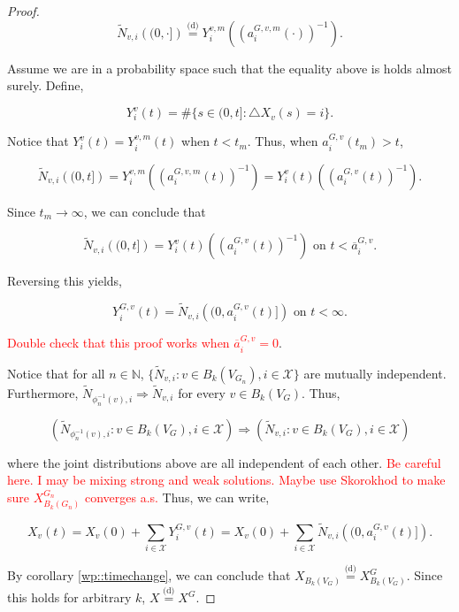 \documentclass[12pt]{article}
\newcommand{\mb}{\mathbb}
\newcommand{\mc}{\mathcal}
\newcommand{\ra}{\rightarrow}
\newcommand{\ov}{\overline}
\newcommand{\te}{\text}
\newcommand{\tr}{\textcolor{red}}
\newcommand{\ind}{\hspace{24pt}}
\newcommand{\deq}{\overset{\text{(d)}}{=}}			%
\newcommand{\sta}{\mc{X}}							%
\newcommand{\Xf}{X}									%
\newcommand{\poiss}{N}								%
\newcommand{\poissv}[1]{_{#1}}						%
\newcommand{\vind}[1]{_{#1}}						%
\newcommand{\tme}[1]{(#1)}							%
\newcommand{\gind}[1]{^{#1}}						%
\newcommand{\vpara}[1]{^{#1}}						%
\newcommand{\stpara}[1]{_{#1}}						%
\newcommand{\gvpara}[2]{^{#1,#2}}					%
\newcommand{\compen}{a}								%
\newcommand{\compenbd}{\ov{a}}						%
\newcommand{\binver}[1]{(#1)^{-1}}					%
\newcommand{\Xg}{Y}									%
\newcommand{\alt}[1]{\tilde{#1}}					%
\newcommand{\gvjpara}[3]{^{#1,#2,#3}}				%
\begin{document}
\begin{proof}
\[\alt{\poiss}\poissv{v,i}\left((0,\cdot]\right) \deq \Xg^{v,m}\stpara{i}\left(\binver{\compen\gvjpara{G}{v}{m}\stpara{i}\left(\cdot\right)}\right).\]

Assume we are in a probability space such that the equality above is holds almost surely. Define,

\[\Xg\vpara{v}\stpara{i}\tme{t} = \#\{s \in (0,t]: \triangle\Xf\vind{v}\tme{s} = i\}.\]

Notice that \(\Xg\vpara{v}\stpara{i}\tme{t} = \Xg^{v,m}\stpara{i}\tme{t}\) when \(t < t_m\). Thus, when \(\compen\gvpara{G}{v}\stpara{i}(t_m) > t\),

\[\alt{\poiss}\poissv{v,i}\left((0,t]\right) = \Xg^{v,m}\stpara{i}\left(\binver{\compen\gvjpara{G}{v}{m}\stpara{i}\tme{t}}\right) = \Xg\vpara{v}\stpara{i}\tme{t}\left(\binver{\compen\gvpara{G}{v}\stpara{i}\tme{t}}\right).\]

Since \(t_m \ra\infty\), we can conclude that 

\[\alt{\poiss}\poissv{v,i}\left((0,t]\right) = \Xg\vpara{v}\stpara{i}\tme{t}\left(\binver{\compen\gvpara{G}{v}\stpara{i}\tme{t}}\right) \te{ on } t < \compenbd\gvpara{G}{v}\stpara{i}.\]

Reversing this yields,

\[\Xg\gvpara{G}{v}\stpara{i}\tme{t} = \alt{\poiss}\poissv{v,i}\left((0,\compen\gvpara{G}{v}\stpara{i}\tme{t}]\right) \te{ on } t < \infty.\]

\tr{Double check that this proof works when \(\compenbd\gvpara{G}{v}\stpara{i} = 0\)}.

\ind Notice that for all \(n \in \mb{N}\), \(\{\alt{\poiss}\vind{v,i}:v \in B_k(V_{G_n}),i\in \sta\}\) are mutually independent. Furthermore, \(\alt{\poiss}\vind{\phi_n^{-1}(v),i} \Rightarrow  \alt{\poiss}\vind{v,i}\) for every \(v \in B_k(V_G)\). Thus,

\[\left(\alt{\poiss}\vind{\phi_n^{-1}(v),i}:v \in B_k(V_{G}),i\in \sta\right) \Rightarrow \left(\alt{\poiss}\vind{v,i}:v \in B_k(V_{G}),i\in \sta\right)\]

where the joint distributions above are all independent of each other. \tr{Be careful here. I may be mixing strong and weak solutions. Maybe use Skorokhod to make sure \(\Xf\gind{G_n}\vind{B_k(G_n)}\) converges a.s.} Thus, we can write,

\[\Xf\vind{v}\tme{t} = \Xf\vind{v}\tme{0} + \sum_{i\in \sta} \Xg\gvpara{G}{v}\stpara{i}\tme{t} = \Xf\vind{v}\tme{0} + \sum_{i\in \sta} \alt{\poiss}\poissv{v,i}\left((0,\compen\gvpara{G}{v}\stpara{i}\tme{t}]\right).\]

By corollary \ref{wp::timechange}, we can conclude that \(\Xf\vind{B_k(V_G)} \deq \Xf\gind{G}\vind{B_k(V_G)}\). Since this holds for arbitrary \(k\), \(\Xf \deq \Xf\gind{G}\).

\end{proof}
\end{document}
